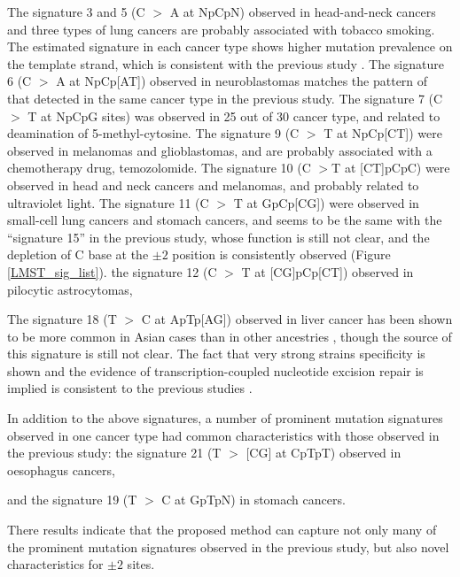 The signature 3 and 5 (C $>$ A at NpCpN) observed in head-and-neck cancers and three types of lung cancers are probably associated with tobacco smoking.
The estimated signature in each cancer type shows higher mutation prevalence on the template strand, which is consistent with the previous study \cite{pmid12379884, pmid23318258}.
The signature 6 (C $>$ A at NpCp[AT]) observed in neuroblastomas matches the pattern of that detected in the same cancer type in the previous study.
The signature 7 (C $>$ T at NpCpG sites) was observed in 25 out of 30 cancer type, and related to deamination of 5-methyl-cytosine.
The signature 9 (C $>$ T at NpCp[CT]) were observed in melanomas and glioblastomas, and are probably associated with a chemotherapy drug, temozolomide.
The signature 10 (C $>$T at [CT]pCpC) were observed in head and neck cancers and melanomas, and probably related to ultraviolet light.
The signature 11 (C $>$ T at GpCp[CG]) were observed in small-cell lung cancers and stomach cancers,
and seems to be the same with the ``signature 15'' in the previous study, whose function is still not clear,
and the depletion of C base at the $\pm 2$ position is consistently observed (Figure \ref{LMST_sig_list}).
the signature 12 (C $>$ T at [CG]pCp[CT]) observed in pilocytic astrocytomas,





The signature 18 (T $>$ C at ApTp[AG]) observed in liver cancer has been shown to be more common in Asian cases than in other ancestries \cite{pmid25362482}, 
though the source of this signature is still not clear.
The fact that very strong strains specificity is shown and 
the evidence of transcription-coupled nucleotide excision repair is implied is consistent to the previous studies \cite{pmid25362482, pmid23318258}.



In addition to the above signatures, a number of prominent mutation signatures observed in one cancer type 
had common characteristics with those observed in the previous study:
the signature 21 (T $>$ [CG] at CpTpT) observed in oesophagus cancers, 

 
and the signature 19 (T $>$ C at GpTpN) in stomach cancers.



There results indicate that the proposed method can capture not only many of the prominent mutation signatures observed in the previous study,
but also novel characteristics for $\pm 2$ sites.




